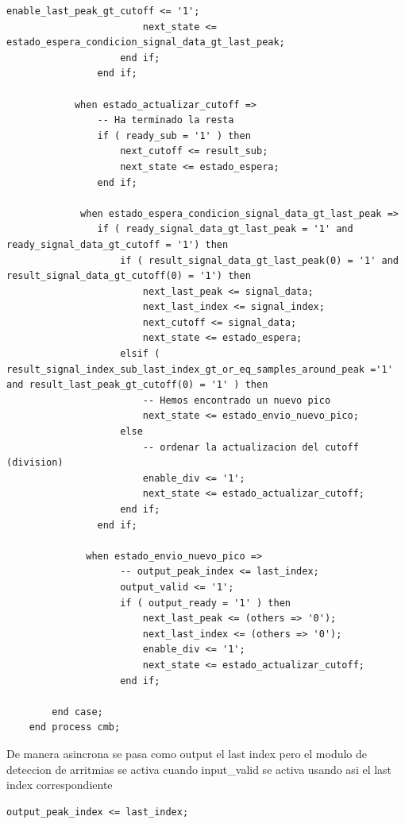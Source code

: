\begin{lstlisting}[frame=single]
                        enable_last_peak_gt_cutoff <= '1';
                        next_state <= estado_espera_condicion_signal_data_gt_last_peak;
                    end if;
                end if;
                
            when estado_actualizar_cutoff =>
                -- Ha terminado la resta
                if ( ready_sub = '1' ) then
                    next_cutoff <= result_sub;
                    next_state <= estado_espera;
                end if;                
                
             when estado_espera_condicion_signal_data_gt_last_peak =>
                if ( ready_signal_data_gt_last_peak = '1' and ready_signal_data_gt_cutoff = '1') then
                    if ( result_signal_data_gt_last_peak(0) = '1' and result_signal_data_gt_cutoff(0) = '1') then
                        next_last_peak <= signal_data;
                        next_last_index <= signal_index;
                        next_cutoff <= signal_data;
                        next_state <= estado_espera;
                    elsif ( result_signal_index_sub_last_index_gt_or_eq_samples_around_peak ='1' and result_last_peak_gt_cutoff(0) = '1' ) then                     
                        -- Hemos encontrado un nuevo pico
                        next_state <= estado_envio_nuevo_pico;
                    else
                        -- ordenar la actualizacion del cutoff (division)
                        enable_div <= '1';
                        next_state <= estado_actualizar_cutoff;
                    end if;
                end if;
                
              when estado_envio_nuevo_pico =>
                    -- output_peak_index <= last_index;
                    output_valid <= '1';
                    if ( output_ready = '1' ) then
                        next_last_peak <= (others => '0');
                        next_last_index <= (others => '0');
                        enable_div <= '1';
                        next_state <= estado_actualizar_cutoff;
                    end if;
                
        end case;
    end process cmb;
\end{lstlisting}

De manera asincrona se pasa como output el last index pero el modulo de deteccion de arritmias se activa cuando input\_valid
se activa usando asi el last index correspondiente 
\lstset{language=VHDL, breaklines=true, basicstyle=\footnotesize}
\begin{lstlisting}[frame=single]
    output_peak_index <= last_index;
\end{lstlisting}

